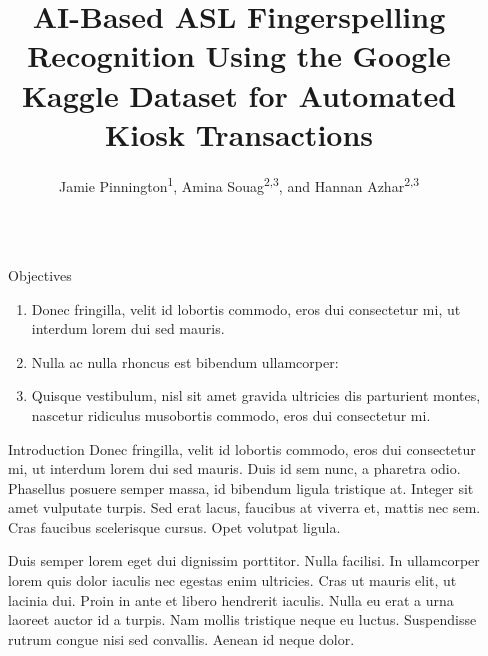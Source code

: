 \documentclass{beamer} %
\title{\LARGE AI-Based ASL Fingerspelling Recognition Using the Google Kaggle Dataset for Automated Kiosk Transactions}  %
\author{Jamie Pinnington\textsuperscript{1}, Amina Souag\textsuperscript{2,3}, and Hannan Azhar\textsuperscript{2,3}}  %
\institute{\textsuperscript{1}Computer Science, \textsuperscript{2}Canterbury Christ Church University, \textsuperscript{3}School of Engineering, Technology and Design}  %
\begin{document}
\begin{frame}[t] %

\begin{columns}[t] %

\begin{column}{0.02\textwidth}\end{column} %

\begin{column}{0.465\textwidth} %


\begin{block}{Objectives}
	\begin{enumerate}
		\item Donec fringilla, velit id lobortis commodo, eros dui consectetur mi, ut interdum lorem dui sed mauris.
		\item Nulla ac nulla rhoncus est bibendum ullamcorper:
		\item Quisque vestibulum, nisl sit amet gravida ultricies dis parturient montes, nascetur ridiculus musobortis commodo, eros dui consectetur mi.
	\end{enumerate}
\end{block}

            
\begin{block}{Introduction}
	Donec fringilla, velit id lobortis commodo, eros dui consectetur mi, ut interdum lorem dui sed mauris. Duis id sem nunc, a pharetra odio. Phasellus posuere \alert{semper massa}, id bibendum ligula tristique at. Integer sit amet vulputate turpis. Sed erat lacus, faucibus at viverra et, mattis nec sem. Cras faucibus scelerisque cursus. Opet volutpat ligula.
	
	\bigskip %
	
	Duis semper lorem eget dui dignissim porttitor. \alert{Nulla facilisi.} In ullamcorper lorem quis dolor iaculis nec egestas enim ultricies. Cras ut mauris elit, ut lacinia dui. Proin in ante et libero hendrerit iaculis. Nulla eu erat a urna laoreet auctor id a turpis. Nam mollis tristique neque eu luctus. Suspendisse rutrum congue nisi sed convallis. Aenean id neque dolor.
\end{block}


\end{column}
\end{columns}
\end{frame}
\end{document}

